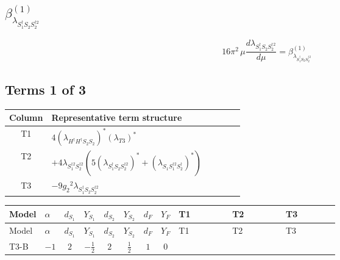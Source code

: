 \documentclass[8pt]{article}
\begin{document}
\begin{landscape}
\section*{$\beta_{\lambda_{S_1^\dagger S_2 S_2^{\dagger 2}}}^{(1)}$}
\[16\pi^2\,\mu\frac{d \lambda_{S_1^\dagger S_2 S_2^{\dagger 2}}}{d\mu}=\beta_{\lambda_{S_1^\dagger S_2 S_2^{\dagger 2}}}^{(1)}\]
\subsection*{Terms 1 of 3}
\begin{center}
\begin{tabular}{@{}c >{\raggedright\arraybackslash}p{0.82\linewidth}@{}}
\toprule
Column & Representative term structure \\
\midrule
T1 & \(\displaystyle 4 \left({\lambda_{H^\dagger H^\dagger S_2 S_2}}\right)^{*} \left({\lambda_{T3}}\right)^{*}\) \\
\midrule
T2 & \(\displaystyle +4 {\lambda_{S_1^{\dagger 2}S_2^{\dagger 2}}} (5 \left({\lambda_{S_1^\dagger S_2 S_2^{\dagger 2}}}\right)^{*}+\left({\lambda_{S_1 S_1^{\dagger 2}S_2^\dagger}}\right)^{*})\) \\
\midrule
T3 & \(\displaystyle -9 {g_2}^2 {\lambda_{S_1^\dagger S_2 S_2^{\dagger 2}}}\) \\
\midrule
\bottomrule
\end{tabular}
\end{center}
\smallskip
\tiny
\begin{longtable}{@{}llcccccc >{\raggedright\arraybackslash}p{0.21\linewidth} >{\raggedright\arraybackslash}p{0.21\linewidth} >{\raggedright\arraybackslash}p{0.21\linewidth}@{}}
\toprule
Model & $\alpha$ & $d_{S_1}$ & $Y_{S_1}$ & $d_{S_2}$ & $Y_{S_2}$ & $d_F$ & $Y_F$ & T1 & T2 & T3 \\
\midrule
\endfirsthead
\toprule
Model & $\alpha$ & $d_{S_1}$ & $Y_{S_1}$ & $d_{S_2}$ & $Y_{S_2}$ & $d_F$ & $Y_F$ & T1 & T2 & T3 \\
\midrule
\endhead
T3-B & $-1$ & $2$ & $-\frac{1}{2}$ & $2$ & $\frac{1}{2}$ & $1$ & $0$ & \scriptsize\adjustbox{max width=\linewidth}{$\begin{gathered} 4 \left({\lambda_{H^\dagger H^\dagger S_2 S_2}}\right)^{*} \left({\lambda_{T3}}\right)^{*}\end{gathered}$} & \scriptsize\adjustbox{max width=\linewidth}{$\begin{gathered} +4 {\lambda_{S_1^{\dagger 2}S_2^{\dagger 2}}} (5 \left({\lambda_{S_1^\dagger S_2 S_2^{\dagger 2}}}\right)^{*}+\left({\lambda_{S_1 S_1^{\dagger 2}S_2^\dagger}}\right)^{*})\end{gathered}$} & \scriptsize\adjustbox{max width=\linewidth}{$\begin{gathered} -9 {g_2}^2 {\lambda_{S_1^\dagger S_2 S_2^{\dagger 2}}}\end{gathered}$} \\

\end{longtable}
\end{landscape}
\end{document}
